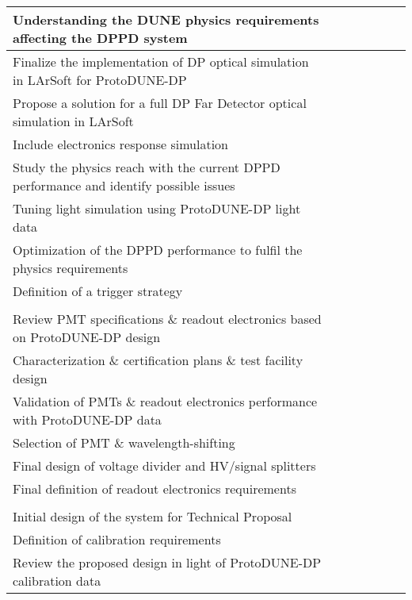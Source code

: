 \begin{table}[htpb]
\begin{center}
\begin{tabular}{|l|c|c|c|c|c|c|}
Understanding the DUNE physics requirements affecting the DPPD system & & \cellcolor{gray} & & & & \\ \hline
Finalize the implementation of DP optical simulation in LArSoft for ProtoDUNE-DP & &  \cellcolor{gray} & & & & \\ \hline
Propose a solution for a full DP Far Detector optical simulation in LArSoft & & &  \cellcolor{gray} & & & \\ \hline
Include electronics response simulation & & &  \cellcolor{gray} & & & \\ \hline
Study the physics reach with the current DPPD performance and identify possible issues & & & &  \cellcolor{gray} & & \\ \hline
Tuning light simulation using ProtoDUNE-DP light data & & & & &  \cellcolor{gray} & \\ \hline
Optimization of the DPPD performance to fulfil the physics requirements & & & & & &  \cellcolor{gray} \\ \hline
Definition of a trigger strategy & & & & & &  \cellcolor{gray} \\ \hline
\rowcolor{dunetablecolor}  \multicolumn{7}{|l|}{\bf Photosensors} \\
\hline
Review PMT specifications \& readout electronics based on ProtoDUNE-DP design & &  \cellcolor{gray} & & & & \\ \hline
Characterization \& certification plans \& test facility design & & &  \cellcolor{gray} & & & \\ \hline
Validation of PMTs \& readout electronics performance with ProtoDUNE-DP data & & & & &  \cellcolor{gray} & \\ \hline
Selection of PMT \& wavelength-shifting & & & & &  \cellcolor{gray} & \\ \hline
Final design of voltage divider and HV/signal splitters & & & & &  \cellcolor{gray} & \\ \hline
Final definition of readout electronics requirements & & & & &  \cellcolor{gray} & \\ \hline
\rowcolor{dunetablecolor} \multicolumn{7}{|l|}{\bf PMT calibration system} \\ \hline
Initial design of the system for Technical Proposal & &  \cellcolor{gray} & & & & \\ \hline
Definition of calibration requirements & & &  \cellcolor{gray} & & & \\ \hline
Review the proposed design in light of ProtoDUNE-DP calibration data & & & &  \cellcolor{gray} & & \\ \hline

\end{tabular}
\end{center}
\end{table}
